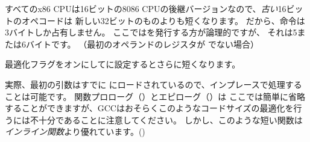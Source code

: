 すべてのx86 CPUは16ビットの8086 CPUの後継バージョンなので、\emph{古い}16ビットのオペコードは
新しい32ビットのものよりも短くなります。 
だから、命令は3バイトしか占有しません。
ここではを発行する方が論理的ですが、
それは5または6バイトです。
（最初のオペランドのレジスタが \EAX でない場合）


\Othree 最適化フラグをオンにしてに設定するとさらに短くなります。




実際、最初の引数はすでに \EAX にロードされているので、インプレースで処理することは可能です。 
関数プロローグ（）とエピローグ（）は
ここでは簡単に省略することができますが、GCCはおそらくこのようなコードサイズの最適化を行うには不十分であることに注意してください。 
しかし、このような短い関数は\emph{インライン関数}より優れています。()

